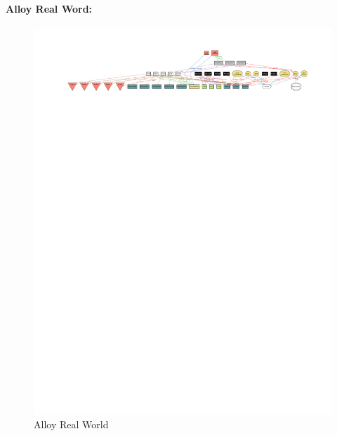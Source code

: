 \paragraph{Alloy Real Word:}
\begin{figure}[p]
   \begin{center}
    \includegraphics[height=\textheight,angle=90]{Resources/RealWorld.pdf}
    \caption{Alloy Real World}
   \end{center}
    \label{fig:realWorld}
\end{figure}
